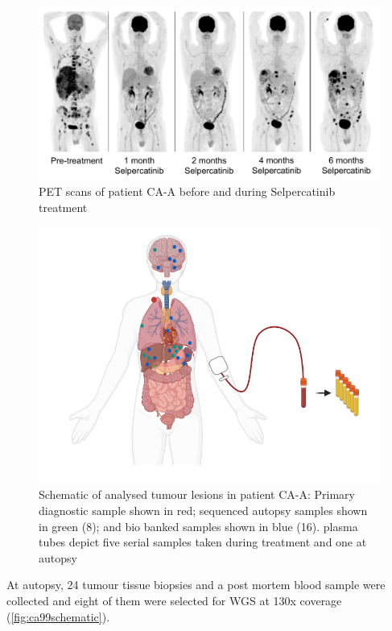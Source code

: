 \begin{figure}[!ht]
\centering
\includegraphics[width=.99\linewidth]{Figures/CA-A_PETscans}
\caption[PET scans of patient CA-A before and during Selpercatinib treatment]{PET scans of patient CA-A before and during Selpercatinib treatment} \label{fig:ca99pet}
\end{figure}


\begin{figure}[!ht]
\centering
\includegraphics[width=.99\linewidth]{Figures/CA-A_schematic_CA99}
\caption[Schematic of analysed tumour lesions in patient CA-A]{Schematic of analysed tumour lesions in patient CA-A: Primary diagnostic sample shown in red; sequenced autopsy samples shown in green (8); and bio banked samples shown in blue (16). plasma tubes depict five serial samples taken during treatment and one at autopsy} \label{fig:ca99schematic}
\end{figure}


At autopsy, 24 tumour tissue biopsies and a post mortem blood sample were collected and eight of them were selected for WGS at 130x coverage (\autoref{fig:ca99schematic}). 

